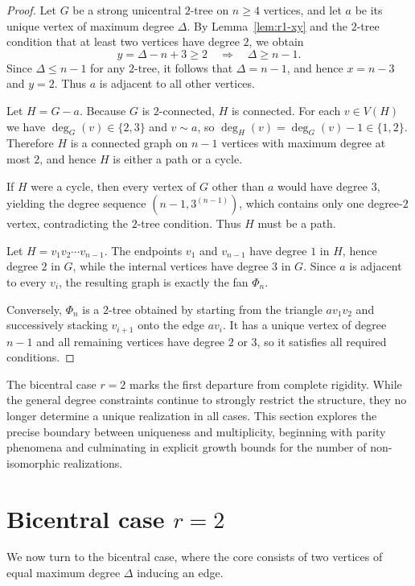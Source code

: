 \documentclass[12pt]{article}
\numberwithin{equation}{section}
\begin{document}
\begin{proof}
Let $G$ be a strong unicentral $2$-tree on $n\ge 4$ vertices, and let $a$ be its
unique vertex of maximum degree $\Delta$.
By Lemma~\ref{lem:r1-xy} and the $2$-tree condition that at least two vertices have
degree $2$, we obtain
\[
y=\Delta-n+3 \ge 2 \quad\Rightarrow\quad \Delta \ge n-1.
\]
Since $\Delta\le n-1$ for any $2$-tree, it follows that $\Delta=n-1$, and hence
$x=n-3$ and $y=2$.
Thus $a$ is adjacent to all other vertices.

Let $H=G-a$.
Because $G$ is $2$-connected, $H$ is connected.
For each $v\in V(H)$ we have $\deg_G(v)\in\{2,3\}$ and $v\sim a$, so
$\deg_H(v)=\deg_G(v)-1\in\{1,2\}$.
Therefore $H$ is a connected graph on $n-1$ vertices with maximum degree at most
$2$, and hence $H$ is either a path or a cycle.

If $H$ were a cycle, then every vertex of $G$ other than $a$ would have degree $3$,
yielding the degree sequence $(n-1,3^{(n-1)})$, which contains only one degree-$2$
vertex, contradicting the $2$-tree condition.
Thus $H$ must be a path.

Let $H=v_1v_2\cdots v_{n-1}$.
The endpoints $v_1$ and $v_{n-1}$ have degree $1$ in $H$, hence degree $2$ in $G$,
while the internal vertices have degree $3$ in $G$.
Since $a$ is adjacent to every $v_i$, the resulting graph is exactly the fan
$\Phi_n$.

Conversely, $\Phi_n$ is a $2$-tree obtained by starting from the triangle
$av_1v_2$ and successively stacking $v_{i+1}$ onto the edge $av_i$.
It has a unique vertex of degree $n-1$ and all remaining vertices have degree
$2$ or $3$, so it satisfies all required conditions.
\end{proof}

The bicentral case $r=2$ marks the first departure from complete rigidity. While the general degree constraints continue to strongly restrict the structure, they no longer determine a unique realization in all cases. This section explores the precise boundary between uniqueness and multiplicity, beginning with parity phenomena and culminating in explicit growth bounds for the number of non-isomorphic realizations.
\section{Bicentral case \texorpdfstring{$r=2$}{r=2}}

We now turn to the bicentral case, where the core consists of two vertices of equal maximum degree $\Delta$ inducing an edge.
\end{document}

